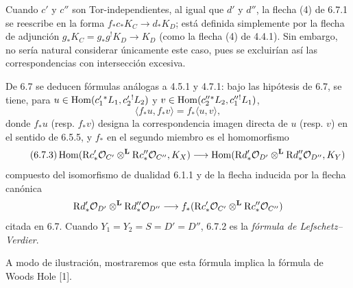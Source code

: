 Cuando $c'$ y $c''$ son Tor-independientes, al igual que $d'$ y $d''$, la flecha (4) de 6.7.1 se reescribe en la forma $f_*c_*K_C\to d_*K_D$; está definida simplemente por la flecha de adjunción $g_*K_C=g_*g^!K_D\to K_D$ (como la flecha (4) de 4.4.1). Sin embargo, no sería natural considerar únicamente este caso, pues se excluirían así las correspondencias con intersección excesiva.

De 6.7 se deducen fórmulas análogas a 4.5.1 y 4.7.1: bajo las hipótesis de 6.7, se tiene, para $u\in\operatorname{Hom}(c_1'{}^*L_1,c_2'{}^!L_2)$ y $v\in\operatorname{Hom}(c_2''{}^*L_2,c_1''{}^!L_1)$,
\begin{equation}
\tag{6.7.2}
\langle f_*u,f_*v\rangle=f_*\langle u,v\rangle,
\end{equation}
donde $f_*u$ (resp. $f_*v$) designa la correspondencia imagen directa de $u$ (resp. $v$) en el sentido de 6.5.5, y $f_*$ en el segundo miembro es el homomorfismo
\begin{equation}
\tag{6.7.3}
\operatorname{Hom}(\mathrm{R} c'_*\mathcal{O}_{C'}\otimes^{\mathbf L}\mathrm{R} c''_*\mathcal{O}_{C''},K_X)
\longrightarrow
\operatorname{Hom}(\mathrm{R} d'_*\mathcal{O}_{D'}\otimes^{\mathbf L}\mathrm{R} d''_*\mathcal{O}_{D''},K_Y)
\end{equation}
compuesto del isomorfismo de dualidad 6.1.1 y de la flecha inducida por la flecha canónica
\[
\mathrm{R} d'_*\mathcal{O}_{D'}\otimes^{\mathbf L}\mathrm{R} d''_*\mathcal{O}_{D''}\longrightarrow f_*(\mathrm{R} c'_*\mathcal{O}_{C'}\otimes^{\mathbf L}\mathrm{R} c''_*\mathcal{O}_{C''})
\]
citada en 6.7. Cuando $Y_1=Y_2=S=D'=D''$, 6.7.2 es la \emph{fórmula de Lefschetz--Verdier}.

A modo de ilustración, mostraremos que esta fórmula implica la fórmula de Woods Hole [1].
